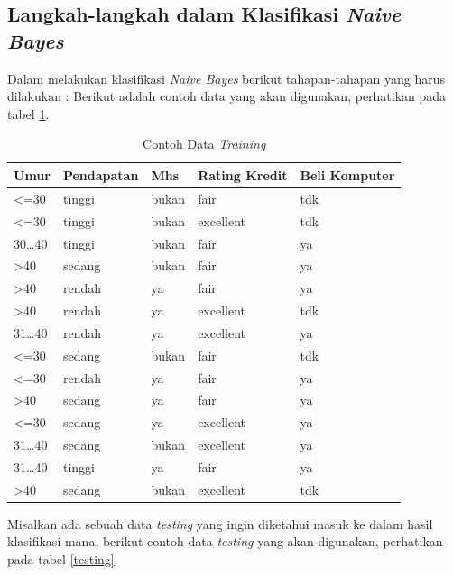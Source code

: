 \subsection{Langkah-langkah dalam Klasifikasi \textit{Naive Bayes}}
Dalam melakukan klasifikasi \textit{Naive Bayes} berikut tahapan-tahapan yang harus dilakukan \cite{kosasih2018pengklasifikasian}:
Berikut adalah contoh data yang akan digunakan, perhatikan pada tabel \ref{contohdata}.
\begin{table}[!ht]
\centering
\caption{Contoh Data \textit{Training}}
\label{contohdata}
\begin{tabular}{|l|l|l|l|l|}
\hline
Umur             & Pendapatan & Mhs   & Rating Kredit & Beli Komputer \\ \hline
\textless{}=30   & tinggi     & bukan & fair          & tdk           \\ \hline
\textless{}=30   & tinggi     & bukan & excellent     & tdk           \\ \hline
30…40            & tinggi     & bukan & fair          & ya            \\ \hline
\textgreater{}40 & sedang     & bukan & fair          & ya            \\ \hline
\textgreater{}40 & rendah     & ya    & fair          & ya            \\ \hline
\textgreater{}40 & rendah     & ya    & excellent     & tdk           \\ \hline
31…40            & rendah     & ya    & excellent     & ya            \\ \hline
\textless{}=30   & sedang     & bukan & fair          & tdk           \\ \hline
\textless{}=30   & rendah     & ya    & fair          & ya            \\ \hline
\textgreater{}40 & sedang     & ya    & fair          & ya            \\ \hline
\textless{}=30   & sedang     & ya    & excellent     & ya            \\ \hline
31…40            & sedang     & bukan & excellent     & ya            \\ \hline
31…40            & tinggi     & ya    & fair          & ya            \\ \hline
\textgreater{}40 & sedang     & bukan & excellent     & tdk           \\ \hline
\end{tabular}
\end{table}
Misalkan ada sebuah data \textit{testing} yang ingin diketahui masuk ke dalam hasil klasifikasi mana, berikut contoh data \textit{testing} yang akan digunakan, perhatikan pada tabel \ref{testing}

